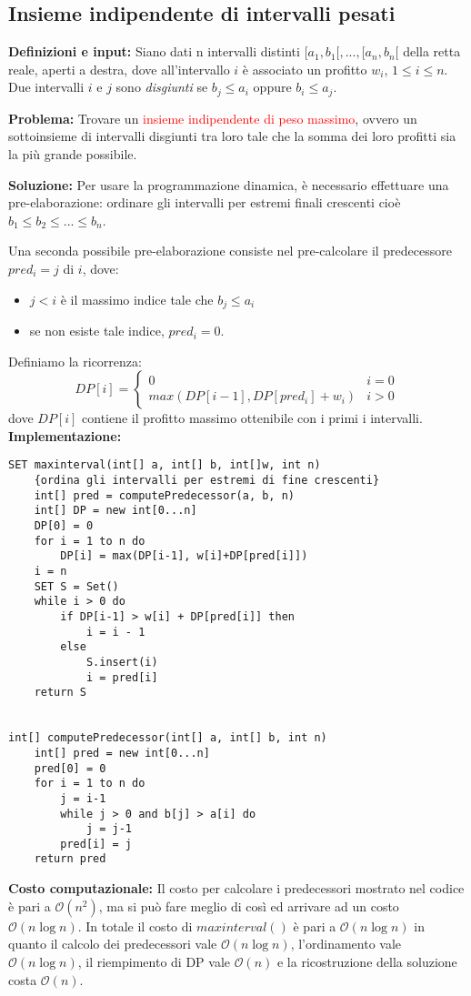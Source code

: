 \documentclass[../cheatSheetAlgoritmi.tex]{subfiles}
\begin{document}
\subsection{Insieme indipendente di intervalli pesati}
\label{sec:indSet}
\textbf{Definizioni e input:} Siano dati n intervalli distinti $[a_1, b_1[, ..., [a_n,b_n[$ della retta reale, aperti a destra, dove all'intervallo $i$ è associato un profitto $w_{i}$, $1\leq i \leq n$. Due intervalli $i$ e $j$ sono \emph{disgiunti} se $b_j \leq a_i$ oppure $b_i \leq a_j.$

\bigskip

\textbf{Problema:} Trovare un \textcolor{red}{insieme indipendente di peso massimo}, ovvero un sottoinsieme di intervalli disgiunti tra loro tale che la somma dei loro profitti sia la più grande possibile.

\bigskip

\textbf{Soluzione:} Per usare la programmazione dinamica, è necessario effettuare una pre-elaborazione: ordinare gli intervalli per estremi finali crescenti cioè $b_1 \leq b_2 \leq ... \leq b_n$. 

Una seconda possibile pre-elaborazione consiste nel pre-calcolare il predecessore $pred_{i} = j$ di $i$, dove: 
\begin{itemize}
	\item $j < i$ è il massimo indice tale che $b_j \leq a_i$
	\item se non esiste tale indice, $pred_{i} = 0$.
\end{itemize}
Definiamo la ricorrenza:
\begin{equation*}
  	DP[i] =\begin{cases}
    	0 & \text{$i = 0$}\\
    	max(DP[i-1], DP[pred_{i}] + w_{i})  & \text{$i > 0$}   	
  	\end{cases}
\end{equation*}
dove $DP[i]$ contiene il profitto massimo ottenibile con i primi i intervalli.
\newpage
\noindent
\textbf{Implementazione:}
\begin{lstlisting}[caption= Insieme indipendente di intervalli pesati]
SET maxinterval(int[] a, int[] b, int[]w, int n)
	{ordina gli intervalli per estremi di fine crescenti}
	int[] pred = computePredecessor(a, b, n)
	int[] DP = new int[0...n]
	DP[0] = 0
	for i = 1 to n do
		DP[i] = max(DP[i-1], w[i]+DP[pred[i]])
	i = n
	SET S = Set()
	while i > 0 do
		if DP[i-1] > w[i] + DP[pred[i]] then
			i = i - 1
		else
			S.insert(i)
			i = pred[i]
	return S

	
int[] computePredecessor(int[] a, int[] b, int n)
	int[] pred = new int[0...n]
	pred[0] = 0
	for i = 1 to n do
		j = i-1
		while j > 0 and b[j] > a[i] do
			j = j-1
		pred[i] = j
	return pred
\end{lstlisting}
\textbf{Costo computazionale:} Il costo per calcolare i predecessori mostrato nel codice è pari a $\mathcal{O}(n^{2})$, ma si può fare meglio di così ed arrivare ad un costo $\mathcal{O}(n \log n)$.
In totale il costo di $maxinterval()$ è pari a $\mathcal{O}(n \log n)$ in quanto il calcolo dei predecessori vale $\mathcal{O}(n \log n)$, l'ordinamento vale $\mathcal{O}(n \log n)$, il riempimento di DP vale $\mathcal{O}(n)$  e la ricostruzione della soluzione costa $\mathcal{O}(n)$.
\end{document}
